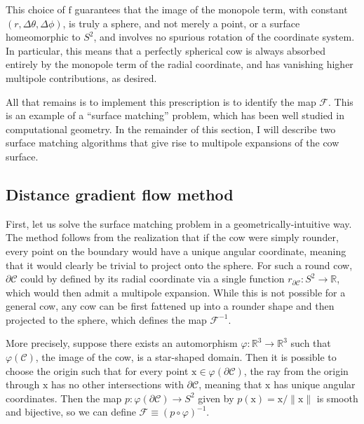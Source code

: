 \documentclass[
    prd, twocolumn, nofootinbib, amsmath, amssymb,
    aps, floatfix, preprintnumbers
]{revtex4-2}
\newcommand{\bb}[1]{\bm{\mathrm{#1}}}
\begin{document}
This choice of $\bb f$ guarantees that the image of the monopole term, with constant $(r, \Delta\theta, \Delta\phi)$, is truly a sphere, and not merely a point, or a surface homeomorphic to $S^2$, and involves no spurious rotation of the coordinate system. In particular, this means that a perfectly spherical cow is always absorbed entirely by the monopole term of the radial coordinate, and has vanishing higher multipole contributions, as desired.

All that remains is to implement this prescription is to identify the map $\mathcal F$. This is an example of a ``surface matching'' problem, which has been well studied in computational geometry. In the remainder of this section, I will describe two surface matching algorithms that give rise to multipole expansions of the cow surface.

\subsection{Distance gradient flow method}
First, let us solve the surface matching problem in a geometrically-intuitive way. The method follows from the realization that if the cow were simply rounder, every point on the boundary would have a unique angular coordinate, meaning that it would clearly be trivial to project onto the sphere. For such a round cow, $\partial\mathcal C$ could by defined by its radial coordinate via a single function $r_{\partial\mathcal C}\colon S^2\to\mathbb R$, which would then admit a multipole expansion. While this is not possible for a general cow, any cow can be first fattened up into a rounder shape and then projected to the sphere, which defines the map $\mathcal F^{-1}$.

More precisely, suppose there exists an automorphism $\varphi\colon\mathbb R^3\to\mathbb R^3$ such that $\varphi(\mathcal C)$, the image of the cow, is a star-shaped domain. Then it is possible to choose the origin such that for every point $\bb x\in\varphi(\partial\mathcal C)$, the ray from the origin through $\bb x$ has no other intersections with $\partial\mathcal C$, meaning that $\bb x$ has unique angular coordinates. Then the map $p\colon\varphi(\partial\mathcal C)\to S^2$ given by $p(\bb x) = \bb x/\|\bb x\|$ is smooth and bijective, so we can define $\mathcal F \equiv (p\circ\varphi)^{-1}$.
\end{document}
